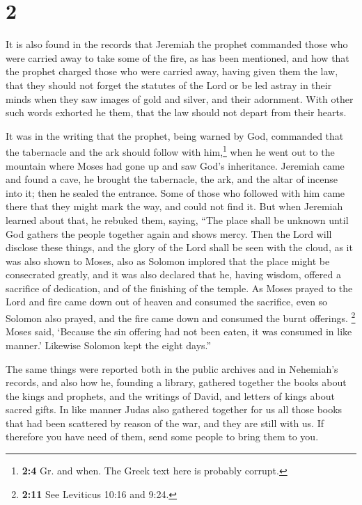 \hypertarget{section-1}{%
\section{2}\label{section-1}}

 It is also found in the records that Jeremiah the prophet
commanded those who were carried away to take some of the fire, as has
been mentioned,  and how that the prophet charged those
who were carried away, having given them the law, that they should not
forget the statutes of the Lord or be led astray in their minds when
they saw images of gold and silver, and their adornment. 
With other such words exhorted he them, that the law should not depart
from their hearts.

 It was in the writing that the prophet, being warned by
God, commanded that the tabernacle and the ark should follow with
him,\footnote{\textbf{2:4} Gr. and when. The Greek text here is probably
  corrupt.} when he went out to the mountain where Moses had gone up and
saw God's inheritance.  Jeremiah came and found a cave, he
brought the tabernacle, the ark, and the altar of incense into it; then
he sealed the entrance.  Some of those who followed with
him came there that they might mark the way, and could not find it.
 But when Jeremiah learned about that, he rebuked them,
saying, ``The place shall be unknown until God gathers the people
together again and shows mercy.  Then the Lord will
disclose these things, and the glory of the Lord shall be seen with the
cloud, as it was also shown to Moses, also as Solomon implored that the
place might be consecrated greatly,  and it was also
declared that he, having wisdom, offered a sacrifice of dedication, and
of the finishing of the temple.  As Moses prayed to the
Lord and fire came down out of heaven and consumed the sacrifice, even
so Solomon also prayed, and the fire came down and consumed the burnt
offerings.  \footnote{\textbf{2:11} See Leviticus 10:16
  and 9:24.} Moses said, `Because the sin offering had not been eaten,
it was consumed in like manner.'  Likewise Solomon kept
the eight days.''

 The same things were reported both in the public
archives and in Nehemiah's records, and also how he, founding a library,
gathered together the books about the kings and prophets, and the
writings of David, and letters of kings about sacred gifts.
 In like manner Judas also gathered together for us all
those books that had been scattered by reason of the war, and they are
still with us.  If therefore you have need of them, send
some people to bring them to you.

